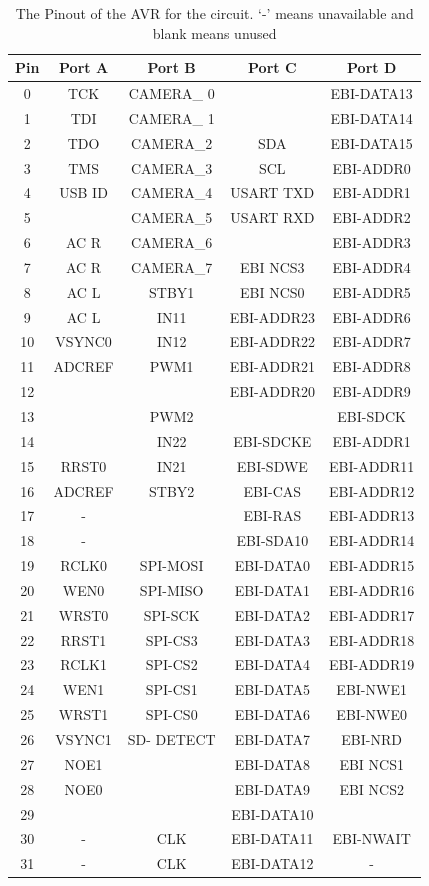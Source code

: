 \begin{table}
\centering
\caption{The Pinout of the AVR for the circuit. `-' means unavailable and blank means unused}
\label{table:UC3C:Pinout}
\begin{tabular}{ccccc}\toprule%
Pin & Port A & Port B & Port C & Port D \\ \toprule
0&TCK&CAMERA\_ 0&&EBI-DATA13\\ \midrule
1&TDI&CAMERA\_ 1&&EBI-DATA14\\\midrule
2&TDO&CAMERA\_2&SDA&EBI-DATA15\\\midrule
3&TMS&CAMERA\_3&SCL&EBI-ADDR0\\\midrule
4&USB ID&CAMERA\_4&USART TXD&EBI-ADDR1\\\midrule
5&&CAMERA\_5&USART RXD&EBI-ADDR2\\\midrule
6&AC R&CAMERA\_6&&EBI-ADDR3\\\midrule
7&AC R&CAMERA\_7&EBI NCS3&EBI-ADDR4\\\midrule
8&AC L&STBY1&EBI NCS0&EBI-ADDR5\\\midrule
9&AC L&IN11&EBI-ADDR23&EBI-ADDR6\\\midrule
10&VSYNC0&IN12&EBI-ADDR22&EBI-ADDR7\\\midrule
11&ADCREF&PWM1&EBI-ADDR21&EBI-ADDR8\\\midrule
12&&&EBI-ADDR20&EBI-ADDR9\\\midrule
13&&PWM2&&EBI-SDCK\\\midrule
14&&IN22&EBI-SDCKE&EBI-ADDR1\\\midrule
15&RRST0&IN21&EBI-SDWE&EBI-ADDR11\\\midrule
16&ADCREF&STBY2&EBI-CAS&EBI-ADDR12\\\midrule
17&-&&EBI-RAS&EBI-ADDR13\\\midrule
18&-&&EBI-SDA10&EBI-ADDR14\\\midrule
19&RCLK0&SPI-MOSI&EBI-DATA0&EBI-ADDR15\\\midrule
20&WEN0&SPI-MISO&EBI-DATA1&EBI-ADDR16\\\midrule
21&WRST0&SPI-SCK&EBI-DATA2&EBI-ADDR17\\\midrule
22&RRST1&SPI-CS3&EBI-DATA3&EBI-ADDR18\\\midrule
23&RCLK1&SPI-CS2&EBI-DATA4&EBI-ADDR19\\\midrule
24&WEN1&SPI-CS1&EBI-DATA5&EBI-NWE1\\\midrule
25&WRST1&SPI-CS0&EBI-DATA6&EBI-NWE0\\\midrule
26&VSYNC1&SD- DETECT&EBI-DATA7&EBI-NRD\\\midrule
27&NOE1&&EBI-DATA8&EBI NCS1\\\midrule
28&NOE0&&EBI-DATA9&EBI NCS2\\\midrule
29&&&EBI-DATA10&\\\midrule
30&-&CLK&EBI-DATA11&EBI-NWAIT\\\midrule
31&-&CLK&EBI-DATA12&-\\ \bottomrule

\end{tabular}
\end{table}

